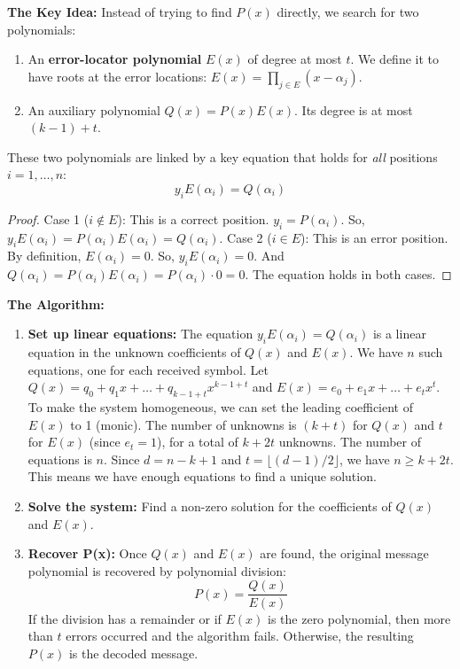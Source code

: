 \textbf{The Key Idea:} Instead of trying to find $P(x)$ directly, we search for two polynomials:
\begin{enumerate}
    \item An \textbf{error-locator polynomial} $E(x)$ of degree at most $t$. We define it to have roots at the error locations: $E(x) = \prod_{j \in E} (x - \alpha_j)$.
    \item An auxiliary polynomial $Q(x) = P(x)E(x)$. Its degree is at most $(k-1) + t$.
\end{enumerate}
These two polynomials are linked by a key equation that holds for \textit{all} positions $i=1, \dots, n$:
\[ y_i E(\alpha_i) = Q(\alpha_i) \]
\begin{proof}
Case 1 ($i \notin E$): This is a correct position. $y_i = P(\alpha_i)$. So, $y_i E(\alpha_i) = P(\alpha_i)E(\alpha_i) = Q(\alpha_i)$.
Case 2 ($i \in E$): This is an error position. By definition, $E(\alpha_i) = 0$. So, $y_i E(\alpha_i) = 0$. And $Q(\alpha_i) = P(\alpha_i)E(\alpha_i) = P(\alpha_i) \cdot 0 = 0$.
The equation holds in both cases.
\end{proof}

\textbf{The Algorithm:}
\begin{enumerate}
    \item \textbf{Set up linear equations:} The equation $y_i E(\alpha_i) = Q(\alpha_i)$ is a linear equation in the unknown coefficients of $Q(x)$ and $E(x)$. We have $n$ such equations, one for each received symbol.
    Let $Q(x) = q_0 + q_1 x + \dots + q_{k-1+t} x^{k-1+t}$ and $E(x) = e_0 + e_1 x + \dots + e_t x^t$. To make the system homogeneous, we can set the leading coefficient of $E(x)$ to 1 (monic).
    The number of unknowns is $(k+t)$ for $Q(x)$ and $t$ for $E(x)$ (since $e_t=1$), for a total of $k+2t$ unknowns.
    The number of equations is $n$. Since $d=n-k+1$ and $t=\lfloor(d-1)/2\rfloor$, we have $n \ge k+2t$. This means we have enough equations to find a unique solution.

    \item \textbf{Solve the system:} Find a non-zero solution for the coefficients of $Q(x)$ and $E(x)$.

    \item \textbf{Recover P(x):} Once $Q(x)$ and $E(x)$ are found, the original message polynomial is recovered by polynomial division:
    \[ P(x) = \frac{Q(x)}{E(x)} \]
    If the division has a remainder or if $E(x)$ is the zero polynomial, then more than $t$ errors occurred and the algorithm fails. Otherwise, the resulting $P(x)$ is the decoded message.
\end{enumerate}

